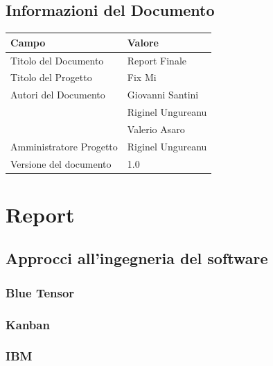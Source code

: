 \documentclass{report}
\begin{document}
	
	\section{Informazioni del Documento}
	
	\begin{center} %
		\centering
		\begin{tabular}{ |p{4cm}|p{4cm}|  }
			\hline
			\centering Campo & \qquad\qquad Valore \\ %
			\hline
			Titolo del Documento & Report Finale \\
			\hline
			Titolo del Progetto & Fix Mi \\
			\hline
			Autori del Documento &
			Giovanni Santini \\ & Riginel Ungureanu \\ & Valerio Asaro \\
			\hline
			Amministratore Progetto & Riginel Ungureanu\\
			\hline
			Versione del documento & 1.0 \\
			\hline
		\end{tabular}
	\end{center}
	
	
	
\chapter{Report}

\section{Approcci all'ingegneria del software}

\subsection{Blue Tensor}

\subsection{Kanban}

\subsection{IBM}
\end{document}
